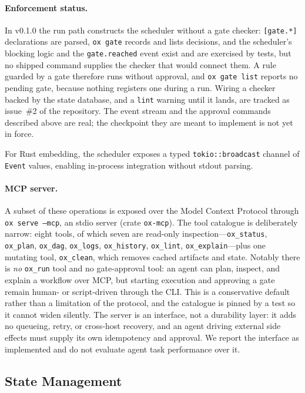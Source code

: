 \documentclass[12pt,a4paper]{article}
\newcommand{\code}[1]{{\texttt{\small\color{inlinecode}#1}}}
\begin{document}
\paragraph{Enforcement status.}
In v0.1.0 the run path constructs the scheduler without a gate checker:
\code{[gate.*]} declarations are parsed, \code{ox gate} records and
lists decisions, and the scheduler's blocking logic and the
\code{gate.reached} event exist and are exercised by tests, but no
shipped command supplies the checker that would connect them. A rule
guarded by a gate therefore runs without approval, and \code{ox gate
list} reports no pending gate, because nothing registers one during a
run. Wiring a checker backed by the state database, and a \code{lint}
warning until it lands, are tracked as issue~\#2 of the repository. The
event stream and the approval commands described above are real; the
checkpoint they are meant to implement is not yet in force.

For Rust embedding, the scheduler exposes a typed
\code{tokio::\allowbreak{}broadcast} channel of \code{Event}
values, enabling in-process integration without stdout parsing.

\paragraph{MCP server.}
A subset of these operations is exposed over the Model Context Protocol
through \code{ox serve --mcp}, an stdio server (crate \code{ox-mcp}).
The tool catalogue is deliberately narrow: eight tools, of which seven are
read-only inspection---\code{ox\_status}, \code{ox\_plan}, \code{ox\_dag},
\code{ox\_logs}, \code{ox\_history}, \code{ox\_lint},
\code{ox\_explain}---plus one mutating tool, \code{ox\_clean}, which
removes cached artifacts and state. Notably there is \emph{no}
\code{ox\_run} tool and no gate-approval tool: an agent can plan,
inspect, and explain a workflow over MCP, but starting execution and
approving a gate remain human- or script-driven through the CLI. This is
a conservative default rather than a limitation of the protocol, and the
catalogue is pinned by a test so it cannot widen silently. The server is
an interface, not a durability layer: it adds no queueing, retry, or
cross-host recovery, and an agent driving external side effects must
supply its own idempotency and approval. We report the interface as
implemented and do not evaluate agent task performance over it.

\subsection{State Management}
\label{sec:state}
\end{document}
